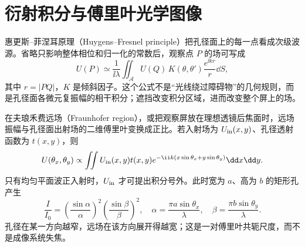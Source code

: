 \section{衍射积分与傅里叶光学图像}

惠更斯--菲涅耳原理（Huygens--Fresnel principle）把孔径面上的每一点看成次级波源。省略只影响整体相位和归一化的常数后，观察点 $P$ 的场可写成
\begin{equation}
 U(P)\simeq\frac1{\ii\lambda}\iint_{\mathcal A}
 U(Q)\,K(\theta,\theta')\frac{e^{\ii k r}}r\dd S,
\end{equation}
其中 $r=|PQ|$，$K$ 是倾斜因子。这个公式不是“光线绕过障碍物”的几何规则，而是孔径面各微元复振幅的相干积分；遮挡改变积分区域，进而改变整个屏上的场。

在夫琅禾费远场（Fraunhofer region），或把观察屏放在理想透镜后焦面时，远场振幅与孔径面出射场的二维傅里叶变换成正比。若入射场为 $U_{\rm in}(x,y)$、孔径透射函数为 $t(x,y)$，则
\begin{equation}
 U(\theta_x,\theta_y)\propto
 \iint U_{\rm in}(x,y)t(x,y)e^{-\ii k(x\sin\theta_x+y\sin\theta_y)}\dd x\dd y.
\end{equation}
只有均匀平面波正入射时，$U_{\rm in}$ 才可提出积分号外。此时宽为 $a$、高为 $b$ 的矩形孔产生
\begin{equation}
 \frac I{I_0}=
 \left(\frac{\sin\alpha}{\alpha}\right)^2
 \left(\frac{\sin\beta}{\beta}\right)^2,
 \quad
 \alpha=\frac{\pi a\sin\theta_x}{\lambda},
 \quad
 \beta=\frac{\pi b\sin\theta_y}{\lambda}.
\end{equation}
孔径在某一方向越窄，远场在该方向展开得越宽；这是一对傅里叶共轭尺度，而不是成像系统失焦。

